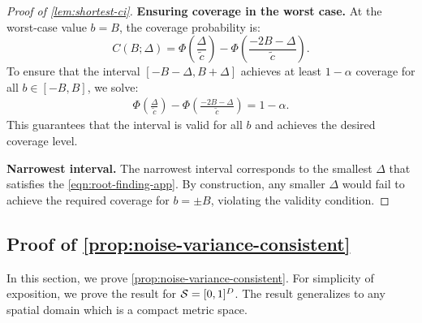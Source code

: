 \begin{proof}[Proof of \cref{lem:shortest-ci}]
\textbf{Ensuring coverage in the worst case.}
At the worst-case value $b = B$, the coverage probability is:
\[
C(B; \Delta) = \Phi\left(\frac{\Delta}{\tilde{c}}\right) - \Phi\left(\frac{-2B - \Delta}{\tilde{c}}\right).
\]
To ensure that the interval $[-B - \Delta, B + \Delta]$ achieves at least $1 - \alpha$ coverage for all $b \in [-B, B]$, we solve:
\begin{align}
\Phi\left(\frac{\Delta}{\tilde{c}}\right) - \Phi\left(\frac{-2B - \Delta}{\tilde{c}}\right) = 1 - \alpha. \label{eqn:root-finding-app}
\end{align}
This guarantees that the interval is valid for all $b$ and achieves the desired coverage level.

\textbf{Narrowest interval.} The narrowest interval corresponds to the smallest $\Delta$ that satisfies the \cref{eqn:root-finding-app}. By construction, any smaller $\Delta$ would fail to achieve the required coverage for $b = \pm B$, violating the validity condition.
\end{proof}


\subsection{Proof of \cref{prop:noise-variance-consistent}}\label{app:proof-noise-variance-consistent}

In this section, we prove \cref{prop:noise-variance-consistent}. For simplicity of exposition, we prove the result for $\mathcal{S} = [0, 1]^D$. The result generalizes to any spatial domain which is a compact metric space.

